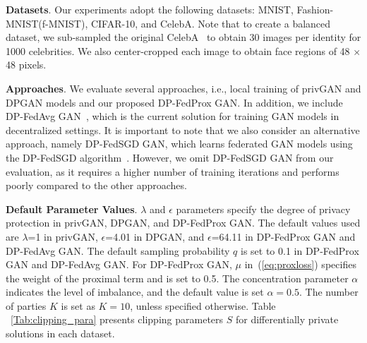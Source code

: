 \documentclass[conference]{IEEEtran}
\newcommand{\partitle}[1]{\smallskip \noindent \textbf{#1}.}
\begin{document}
\partitle{Datasets} Our experiments adopt the following datasets: MNIST, Fashion-MNIST(f-MNIST), CIFAR-10, and CelebA. Note that to create a balanced dataset, we sub-sampled the original CelebA~\cite{CelebAData2014} to obtain 30 images per identity for 1000 celebrities.  We also center-cropped each image to obtain face regions of 48 $\times$ 48 pixels. %

\partitle{Approaches} We evaluate several approaches, i.e., local training of privGAN and DPGAN models and our proposed DP-FedProx GAN. In addition, we include DP-FedAvg GAN~\cite{FedavgGAN2019}, which is the current solution for training GAN models in decentralized settings.  It is important to note that we also consider an alternative approach, namely DP-FedSGD GAN, which learns federated GAN models using the DP-FedSGD algorithm~\cite{DPFedAvg2018}. However, we omit DP-FedSGD GAN from our evaluation, as it requires a higher number of training iterations and performs poorly compared to the other approaches.





\partitle{Default Parameter Values} $\lambda$ and $\epsilon$ parameters specify the degree of privacy protection in privGAN, DPGAN, and DP-FedProx GAN. %
The default values used are $\lambda$=1 in privGAN, $\epsilon$=4.01 in DPGAN, and $\epsilon$=64.11 in DP-FedProx GAN and DP-FedAvg GAN. The default sampling probability $q$ is set to 0.1 in DP-FedProx GAN and DP-FedAvg GAN. For DP-FedProx GAN, $\mu$ in~(\ref{eq:proxloss}) specifies the weight of the proximal term and is set to 0.5.  %
The concentration parameter $\alpha$ indicates the level of imbalance, and the default value is set $\alpha = 0.5$. %
The number of parties $K$ is set as $K=10$, unless specified otherwise.  Table ~\ref{Tab:clipping_para} presents clipping parameters $S$ for differentially private solutions in each dataset.
\end{document}
